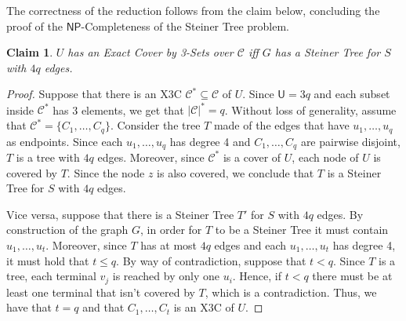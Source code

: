 \documentclass[12pt,a4paper]{article}
\newtheorem{claim}{Claim}
\newcommand{\abs}[1]{\left|#1\right|}
\begin{document}
    The correctness of the reduction follows from the claim below, concluding the proof of the $\mathsf{NP}$-Completeness of the Steiner Tree problem.

    \begin{claim}
        $U$ has an Exact Cover by 3-Sets over $\mathcal{C}$ iff $G$ has a Steiner Tree for $S$ with $4q$ edges.
    \end{claim}

    \begin{proof}
        Suppose that there is an X3C $\mathcal{C}^* \subseteq \mathcal{C}$ of $U$. Since $\mathsf{U} = 3q$ and each subset inside $\mathcal{C}^*$ has 3 elements, we get that $\abs{\mathcal{C}}^* = q$. Without loss of generality, assume that $\mathcal{C}^* = \{C_1, \ldots, C_q\}$. Consider the tree $T$ made of the edges that have $u_1, \ldots, u_q$ as endpoints. Since each $u_1, \ldots, u_q$ has degree 4 and $C_1, \ldots, C_q$ are pairwise disjoint, $T$ is a tree with $4q$ edges. Moreover, since $\mathcal{C}^*$ is a cover of $U$, each node of $U$ is covered by $T$. Since the node $z$ is also covered, we conclude that $T$ is a Steiner Tree for $S$ with $4q$ edges.

        Vice versa, suppose that there is a Steiner Tree $T'$ for $S$ with $4q$ edges. By construction of the graph $G$, in order for $T$ to be a Steiner Tree it must contain $u_1, \ldots, u_t$. Moreover, since $T$ has at most $4q$ edges and each $u_1, \ldots, u_t$ has degree 4, it must hold that $t \leq q$. By way of contradiction, suppose that $t < q$. Since $T$ is a tree, each terminal $v_j$ is reached by only one $u_i$. Hence, if $t < q$ there must be at least one terminal that isn't covered by $T$, which is a contradiction. Thus, we have that $t = q$ and that $C_1, \ldots, C_t$ is an X3C of $U$.
    \end{proof}

    \newpage

    \printbibliography
\end{document}
